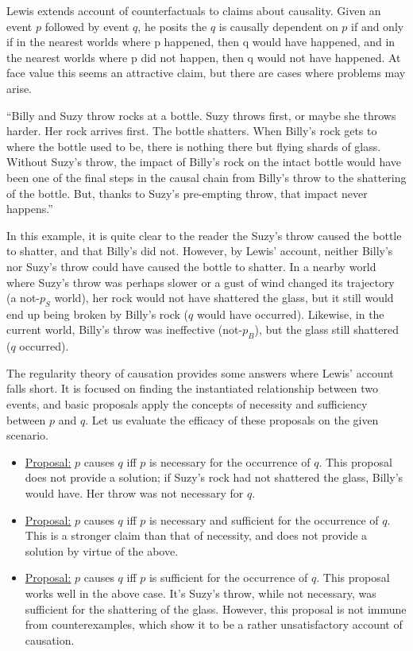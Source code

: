 \documentclass{article}
\begin{document}
Lewis extends account of counterfactuals to claims about causality. Given an event $p$ followed by event $q$, he posits the $q$ is causally dependent on $p$ if and only if in the nearest worlds where p happened, then q would have happened, and in the nearest worlds where p did not happen, then q would not have happened. At face value this seems an attractive claim, but there are cases where problems may arise.

\begin{displayquote}
``Billy and Suzy throw rocks at a bottle. Suzy throws first, or maybe she throws harder. Her rock arrives first. The bottle shatters. When Billy's rock gets to where the bottle used to be, there is nothing there but flying shards of glass. Without Suzy's throw, the impact of Billy's rock on the intact bottle would have been one of the final steps in the causal chain from Billy's throw to the shattering of the bottle. But, thanks to Suzy's pre-empting throw, that impact never happens.''
\end{displayquote}

In this example, it is quite clear to the reader the Suzy's throw caused the bottle to shatter, and that Billy's did not. However, by Lewis' account, neither Billy's nor Suzy's throw could have caused the bottle to shatter. In a nearby world where Suzy's throw was perhaps slower or a gust of wind changed its trajectory (a not-$p_S$ world), her rock would not have shattered the glass, but it still would end up being broken by Billy's rock ($q$ would have occurred). Likewise, in the current world, Billy's throw was ineffective (not-$p_B$), but the glass still shattered ($q$ occurred).

The regularity theory of causation provides some answers where Lewis' account falls short. It is focused on finding the instantiated relationship between two events, and basic proposals apply the concepts of necessity and sufficiency between $p$ and $q$. Let us evaluate the efficacy of these proposals on the given scenario.

    \begin{itemize}
    \item \underline{Proposal:} $p$ causes $q$ iff $p$ is necessary for the occurrence of $q$. \smallbreak
        This proposal does not provide a solution; if Suzy's rock had not shattered the glass, Billy's would have. Her throw was not necessary for $q$.
    \item \underline{Proposal:} $p$ causes $q$ iff $p$ is necessary and sufficient for the occurrence of $q$. \smallbreak
        This is a stronger claim than that of necessity, and does not provide a solution by virtue of the above.
    \item \underline{Proposal:} $p$ causes $q$ iff $p$ is sufficient for the occurrence of $q$. \smallbreak
        This proposal works well in the above case. It's Suzy's throw, while not necessary, was sufficient for the shattering of the glass. However, this proposal is not immune from counterexamples, which show it to be a rather unsatisfactory account of causation.
    \end{itemize}
\end{document}
